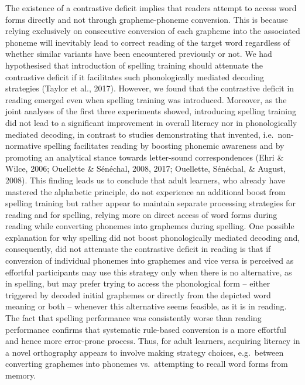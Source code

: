 \documentclass[doc,floatsintext]{apa6}
\begin{document}
The existence of a contrastive deficit implies that readers attempt to
access word forms directly and not through grapheme-phoneme conversion.
This is because relying exclusively on consecutive conversion of each
grapheme into the associated phoneme will inevitably lead to correct
reading of the target word regardless of whether similar variants have
been encountered previously or not. We had hypothesised that
introduction of spelling training should attenuate the contrastive
deficit if it facilitates such phonologically mediated decoding
strategies (Taylor et al., 2017). However, we found that the contrastive
deficit in reading emerged even when spelling training was introduced.
Moreover, as the joint analyses of the first three experiments showed,
introducing spelling training did not lead to a significant improvement
in overall literacy nor in phonologically mediated decoding, in contrast
to studies demonstrating that invented, i.e.~non-normative spelling
facilitates reading by boosting phonemic awareness and by promoting an
analytical stance towards letter-sound correspondences (Ehri \& Wilce,
2006; Ouellette \& Sénéchal, 2008, 2017; Ouellette, Sénéchal, \& August,
2008). This finding leads us to conclude that adult learners, who
already have mastered the alphabetic principle, do not experience an
additional boost from spelling training but rather appear to maintain
separate processing strategies for reading and for spelling, relying
more on direct access of word forms during reading while converting
phonemes into graphemes during spelling. One possible explanation for
why spelling did not boost phonologically mediated decoding and,
consequently, did not attenuate the contrastive deficit in reading is
that if conversion of individual phonemes into graphemes and vice versa
is perceived as effortful participants may use this strategy only when
there is no alternative, as in spelling, but may prefer trying to access
the phonological form -- either triggered by decoded initial graphemes
or directly from the depicted word meaning or both -- whenever this
alternative seems feasible, as it is in reading. The fact that spelling
performance was consistently worse than reading performance confirms
that systematic rule-based conversion is a more effortful and hence more
error-prone process. Thus, for adult learners, acquiring literacy in a
novel orthography appears to involve making strategy choices,
e.g.~between converting graphemes into phonemes vs.~attempting to recall
word forms from memory.
\end{document}
